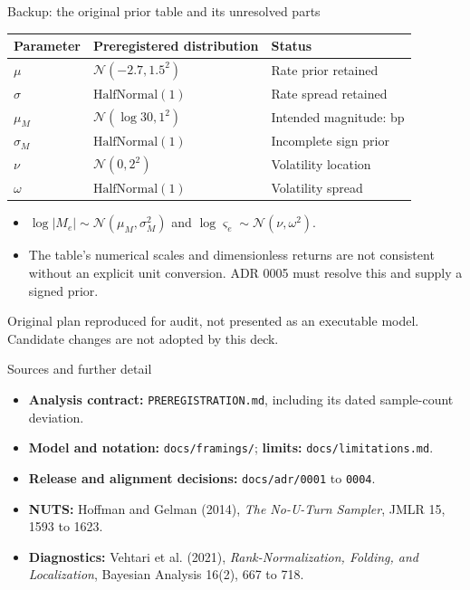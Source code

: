 \documentclass[aspectratio=169,11pt]{beamer}
\newcommand{\source}[1]{\par\vfill{\scriptsize\color{muted}#1}\par}
\begin{document}
\begin{frame}{Backup: the original prior table and its unresolved parts}
\small\renewcommand{\arraystretch}{1.1}
\begin{tabular}{@{}L{0.21\textwidth}L{0.45\textwidth}L{0.28\textwidth}@{}}\toprule
Parameter & Preregistered distribution & Status\\\midrule
$\mu$ & $\mathcal N(-2.7,1.5^2)$ & Rate prior retained\\
$\sigma$ & $\mathrm{HalfNormal}(1)$ & Rate spread retained\\
$\mu_M$ & $\mathcal N(\log30,1^2)$ & Intended magnitude: bp\\
$\sigma_M$ & $\mathrm{HalfNormal}(1)$ & Incomplete sign prior\\
$\nu$ & $\mathcal N(0,2^2)$ & Volatility location\\
$\omega$ & $\mathrm{HalfNormal}(1)$ & Volatility spread\\\bottomrule
\end{tabular}
\vspace{0.35cm}\begin{itemize}
\item $\log|M_e|\sim\mathcal N(\mu_M,\sigma_M^2)$ and $\log\varsigma_e\sim\mathcal N(\nu,\omega^2)$.
\item The table's numerical scales and dimensionless returns are not consistent without an explicit unit conversion. ADR 0005 must resolve this and supply a signed prior.
\end{itemize}
\source{Original plan reproduced for audit, not presented as an executable model. Candidate changes are not adopted by this deck.}
\end{frame}

\begin{frame}{Sources and further detail}
\begin{itemize}
\item \textbf{Analysis contract:} \texttt{PREREGISTRATION.md}, including its dated sample-count deviation.
\item \textbf{Model and notation:} \texttt{docs/framings/}; \textbf{limits:} \texttt{docs/limitations.md}.
\item \textbf{Release and alignment decisions:} \texttt{docs/adr/0001} to \texttt{0004}.
\item \textbf{NUTS:} Hoffman and Gelman (2014), \emph{The No-U-Turn Sampler}, JMLR 15, 1593 to 1623.
\item \textbf{Diagnostics:} Vehtari et al. (2021), \emph{Rank-Normalization, Folding, and Localization}, Bayesian Analysis 16(2), 667 to 718.
\end{itemize}
\end{frame}
\end{document}
